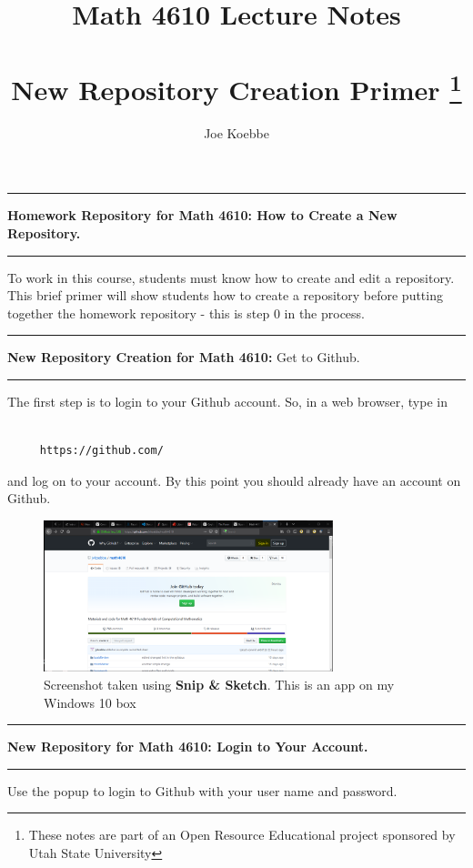 \documentclass[10pt,fleqn]{article}
\title{Math 4610 Lecture Notes \\
            \ \\
       New Repository Creation Primer
  \footnote{These notes are part of an Open Resource Educational project
            sponsored by Utah State University}}
\author{Joe Koebbe}
\begin{document}
\maketitle
\newpage
\vskip0.1in\hrule\vskip0.1in
\noindent
{\bf Homework Repository for Math 4610: How to Create a New Repository.} 
\vskip0.1in\hrule\vskip0.1in
\noindent
To work in this course, students must know how to create and edit a repository.
This brief primer will show students how to create a repository before putting
together the homework repository - this is step 0 in the process.
\newpage
\vskip0.1in\hrule\vskip0.1in
\noindent
{\bf New Repository Creation for Math 4610:} Get to Github. 
\vskip0.1in\hrule\vskip0.1in
The first step is to login to your Github account. So, in a web browser, type in
\begin{verbatim}

     https://github.com/

\end{verbatim}
and log on to your account. By this point you should already have an account on
Github.
\vfill
\begin{figure}[h]
\centering
\includegraphics[width=0.75\textwidth]{../images/newrepository_01.png}
\caption{{Screenshot} taken using {\bf Snip \& Sketch}. This is an app on
         my Windows 10 box}
\end{figure}
\eject
\vskip0.1in\hrule\vskip0.1in
\noindent
{\bf New Repository for Math 4610: Login to Your Account.} 
\vskip0.1in\hrule\vskip0.1in
Use the popup to login to Github with your user name and password.
\vfill
\end{document}
